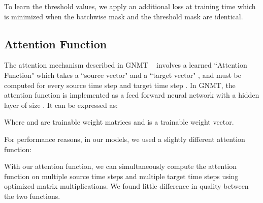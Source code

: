 \documentclass{article} \pdfoutput=1
\begin{document}
To learn the threshold values, we apply an additional loss at training time which is minimized when the batchwise mask and the threshold mask are identical.



\subsection{Attention Function}\label{sec:attention} 

The attention mechanism described in GNMT ~\citep{GNMT} involves a learned ``Attention Function"  which takes a ``source vector"  and a ``target vector" , and must be computed for every source time step  and target time step .  In GNMT, the attention function is implemented as a feed forward neural network with a hidden layer of size .  It can be expressed as:



Where  and  are trainable weight matrices and  is a trainable weight vector.  

For performance reasons, in our models, we used a slightly different attention function:



With our attention function, we can simultaneously compute the attention function on multiple source time steps and multiple target time steps using optimized matrix multiplications.  We found little difference in quality between the two functions.
\end{document}
